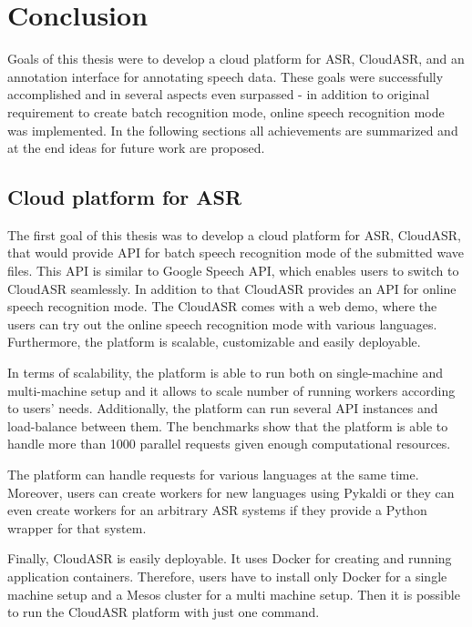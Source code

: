 \chapter*{Conclusion}

Goals of this thesis were to develop a cloud platform for ASR, CloudASR,
  and an annotation interface for annotating speech data.
These goals were successfully accomplished and in several aspects even surpassed
  - in addition to original requirement to create batch recognition mode,
  online speech recognition mode was implemented.
In the following sections all achievements are summarized and
  at the end ideas for future work are proposed.

\section*{Cloud platform for ASR}
The first goal of this thesis was to develop a cloud platform for ASR, CloudASR,
  that would provide API for batch speech recognition mode of the submitted wave files.
This API is similar to Google Speech API,
  which enables users to switch to CloudASR seamlessly.
In addition to that CloudASR provides an API for online speech recognition mode.
The CloudASR comes with a web demo,
  where the users can try out the online speech recognition mode with various languages.
Furthermore, the platform is scalable, customizable and easily deployable.


In terms of scalability,
  the platform is able to run both on single-machine and multi-machine setup
  and it allows to scale number of running workers according to users' needs.
Additionally, the platform can run several API instances and load-balance between them.
The benchmarks show that the platform is able to handle more than 1000 parallel requests
  given enough computational resources.

The platform can handle requests for various languages at the same time.
Moreover, users can create workers for new languages using Pykaldi
  or they can even create workers for an arbitrary ASR systems
  if they provide a Python wrapper for that system.

Finally, CloudASR is easily deployable.
It uses Docker for creating and running application containers.
Therefore, users have to install only Docker for a single machine setup
  and a Mesos cluster for a multi machine setup.
Then it is possible to run the CloudASR platform with just one command.


